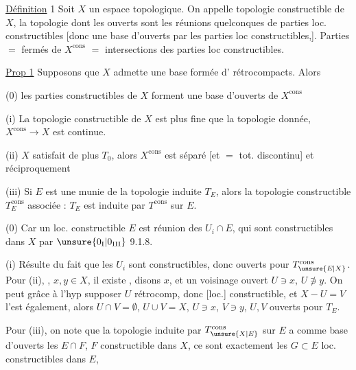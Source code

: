 \uline{Définition} 1 Soit $X$ un espace topologique. On appelle topologie constructible de $X$,  la topologie dont les ouverts sont les réunions quelconques de parties loc. constructibles [donc une base d'ouverts  par les parties loc constructibles,]. Parties  $=$ fermés de $X^{\mathrm{cons}}$ $=$ intersections des parties loc constructibles.

\uline{Prop 1} Supposons que  $X$ admette une base  formée d' rétrocompacts. Alors

(0) les parties constructibles de $X$ forment une base d'ouverts de $X^{\mathrm{cons}}$

(i) La topologie constructible de $X$ est plus fine que la topologie donnée,  $X^{\mathrm{cons}}\longrightarrow X$ est continue.

(ii)   $X$ satisfait de plus $T_0$, alors $X^{\mathrm{cons}}$ est séparé [et $=$ tot. discontinu] et réciproquement

(iii) Si  $E$ est une   munie de la topologie induite $T_E$, alors la topologie constructible $T_E^{\mathrm{cons}}$ associée : $T_E$ est induite par $T^{\mathrm{cons}}$ sur $E$.

(0) Car  un loc. constructible $E$ est réunion des $U_i\cap E$, qui sont constructibles dans $X$ par $\unsure{0_{\mathrm I}|0_{\mathrm{III}}}$ 9.1.8.

(i) Résulte du fait que les $U_i$ sont \inserted{[loc.]} constructibles, donc ouverts pour $T_{\unsure{E|X}}^{\mathrm{cons}}$. Pour (ii), , $x,y\in X$, il existe , disons $x$, et un voisinage ouvert $U\ni x$, $U\not\ni y$. On peut grâce à l'hyp supposer $U$ rétrocomp, donc [loc.] constructible, et $X-U=V$ l'est  également, alors $U\cap V=\emptyset$, $U\cup V=X$, $U\ni x$, $V\ni y$, $U,V$ ouverts pour $T_E$.

Pour (iii), on note que la topologie induite par $T_{\unsure{X|E}}^{\mathrm{cons}}$ sur $E$ a comme base d'ouverts les $E\cap F$, $F$   constructible dans $X$, ce sont exactement les $G\subset E$ loc. constructibles dans $E$,
